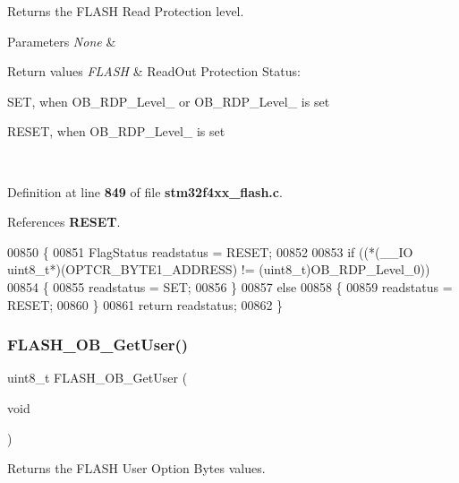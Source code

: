 Returns the F\+L\+A\+SH Read Protection level. 


\begin{DoxyParams}{Parameters}
{\em None} & \\
\hline
\end{DoxyParams}

\begin{DoxyRetVals}{Return values}
{\em F\+L\+A\+SH} & Read\+Out Protection Status\+:
\begin{DoxyItemize}
\item S\+ET, when O\+B\+\_\+\+R\+D\+P\+\_\+\+Level\+\_ or O\+B\+\_\+\+R\+D\+P\+\_\+\+Level\+\_ is set
\item R\+E\+S\+ET, when O\+B\+\_\+\+R\+D\+P\+\_\+\+Level\+\_ is set 
\end{DoxyItemize}\\
\hline
\end{DoxyRetVals}


Definition at line \textbf{ 849} of file \textbf{ stm32f4xx\+\_\+flash.\+c}.



References \textbf{ R\+E\+S\+ET}.


\begin{DoxyCode}
00850 \{
00851   FlagStatus readstatus = RESET;
00852 
00853   \textcolor{keywordflow}{if} ((*(\_\_IO uint8\_t*)(OPTCR_BYTE1_ADDRESS) != (uint8\_t)OB_RDP_Level_0))
00854   \{
00855     readstatus = SET;
00856   \}
00857   \textcolor{keywordflow}{else}
00858   \{
00859     readstatus = RESET;
00860   \}
00861   \textcolor{keywordflow}{return} readstatus;
00862 \}
\end{DoxyCode}
\mbox{\label{group__FLASH_ga737dd808489113af7f8df7f7e9f7baae}} 
\subsubsection{F\+L\+A\+S\+H\+\_\+\+O\+B\+\_\+\+Get\+User()}
{\footnotesize\ttfamily uint8\+\_\+t F\+L\+A\+S\+H\+\_\+\+O\+B\+\_\+\+Get\+User (\begin{DoxyParamCaption}\item[{void}]{ }\end{DoxyParamCaption})}



Returns the F\+L\+A\+SH User Option Bytes values. 


